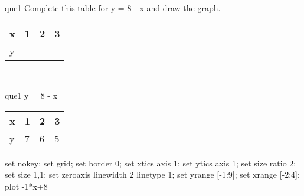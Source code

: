 \documentclass[13.5pt, varwidth=true]{beamer}
\begin{document}
\begin{frame}[shrink=19,fragile]
	\begin{beamercolorbox}[rounded=true, left, shadow=true,wd=14.8cm]{que1}
		 Complete this table for y = 8 - x and draw the graph. \\[0.3cm] \renewcommand{\arraystretch}{1.2}\begin{tabular}{|C|C|C|C|} \hline x & 1 & 2 & 3 \\ \hline y & & & \\ \hline \end{tabular}\\[0.3cm]
	\end{beamercolorbox}
\end{frame}
\begin{frame}[shrink=19,fragile]
	\begin{beamercolorbox}[rounded=true, left, shadow=true,wd=14.8cm]{que1}
		y = 8 - x\renewcommand{\arraystretch}{1.2}\begin{tabular}{|C|C|C|C|} \hline x & 1 & 2 & 3 \\ \hline y & 7 & 6 & 5\\ \hline \end{tabular}\begin{gnuplot}[terminal=pdf] set nokey; set grid; set border 0; set xtics axis 1; set ytics axis 1; set size ratio 2; set size 1,1; set zeroaxis linewidth 2 linetype 1; set yrange [-1:9]; set xrange [-2:4]; plot -1*x+8 \end{gnuplot}
	\end{beamercolorbox}
\end{frame}
\end{document}
